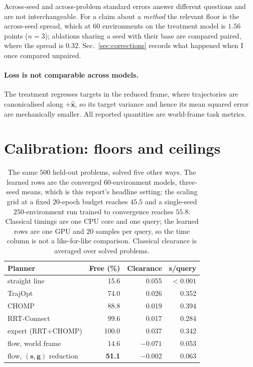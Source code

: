 \documentclass[11pt,a4paper]{article}
\newcommand{\toprule}{\hline}
\newcommand{\midrule}{\hline}
\newcommand{\bottomrule}{\hline}
\newcommand{\xhat}{\hat{\mathbf{x}}}
\newcommand{\svec}{\mathbf{s}}
\newcommand{\gvec}{\mathbf{g}}
\begin{document}
Across-seed and across-problem standard errors answer different questions and are
not interchangeable. For a claim about a \emph{method} the relevant floor is the
across-seed spread, which at $60$ environments on the treatment model is $1.56$
points ($n=3$); ablations sharing a seed with their base are compared paired,
where the spread is $0.32$. Sec.~\ref{sec:corrections} records what happened when
I once compared unpaired.

\paragraph{Loss is not comparable across models.} The treatment regresses targets
in the reduced frame, where trajectories are canonicalised along $+\xhat$, so its
target variance and hence its mean squared error are mechanically smaller. All
reported quantities are world-frame task metrics.

\section{Calibration: floors and ceilings}
\label{sec:calibration}

\begin{table}[t]
\centering
\begin{tabular}{lrrr}
\toprule
Planner & Free (\%) & Clearance & s/query \\
\midrule
straight line                   & 15.6 & 0.055 & $<0.001$ \\
TrajOpt                         & 74.0 & 0.026 & 0.352 \\
CHOMP                           & 88.8 & 0.019 & 0.394 \\
RRT-Connect                     & 99.6 & 0.017 & 0.284 \\
expert (RRT+CHOMP)              & 100.0 & 0.037 & 0.342 \\
\midrule
flow, world frame               & 14.6 & $-0.071$ & 0.053 \\
flow, $(\svec,\gvec)$ reduction & \textbf{51.1} & $-0.002$ & 0.063 \\
\bottomrule
\end{tabular}
\caption{The same $500$ held-out problems, solved five other ways. The learned
rows are the converged $60$-environment models, three-seed means, which is this
report's headline setting; the scaling grid at a fixed $20$-epoch budget reaches
$45.5$ and a single-seed $250$-environment run trained to convergence reaches
$55.8$. Classical
timings are one CPU core and one query; the learned rows are one GPU and $20$
samples per query, so the time column is not a like-for-like comparison.
Classical clearance is averaged over solved problems.}
\label{tab:baselines}
\end{table}
\end{document}
